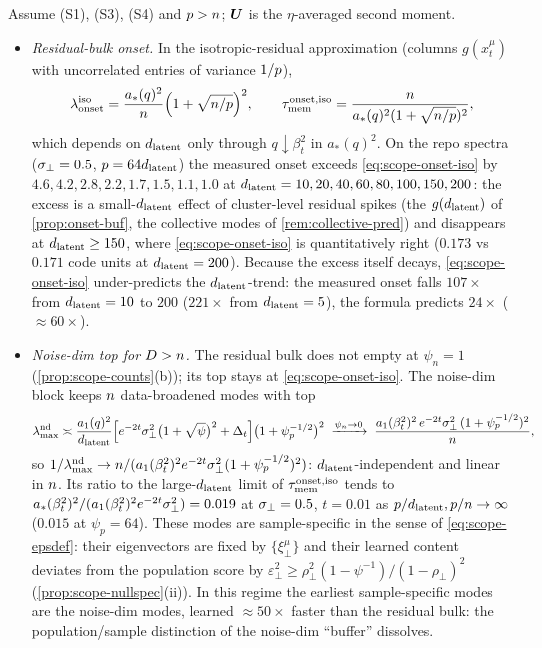 \begin{proposition}\label{prop:scope-rebound}
Assume (S1), (S3), (S4) and $p>n$; $\bm{U}$ is the $\eta$-averaged second moment.
\begin{itemize}
\item[(a)] \emph{Residual-bulk onset.} In the isotropic-residual approximation (columns $g(x^\mu_t)$ with uncorrelated entries of variance $1/p$),
\begin{equation}\label{eq:scope-onset-iso}
\lambda_{\rm onset}^{\rm iso}=\frac{a_*(q)^2}{n}\Big(1+\sqrt{n/p}\Big)^2,\qquad \tau_{\mathrm{mem}}^{\rm onset,iso}=\frac{n}{a_*(q)^2(1+\sqrt{n/p})^2},
\end{equation}
which depends on $d_{\mathrm{latent}}$ only through $q\downarrow\beta_t^2$ in $a_*(q)^2$. On the repo spectra ($\sigma_{\perp}=0.5$, $p=64d_{\mathrm{latent}}$) the measured onset exceeds \eqref{eq:scope-onset-iso} by $4.6,4.2,2.8,2.2,1.7,1.5,1.1,1.0$ at $d_{\mathrm{latent}}=10,20,40,60,80,100,150,200$: the excess is a small-$d_{\mathrm{latent}}$ effect of cluster-level residual spikes (the $g(d_{\mathrm{latent}})$ of \cref{prop:onset-buf}, the collective modes of \cref{rem:collective-pred}) and disappears at $d_{\mathrm{latent}}\ge150$, where \eqref{eq:scope-onset-iso} is quantitatively right ($0.173$ vs $0.171$ code units at $d_{\mathrm{latent}}=200$). Because the excess itself decays, \eqref{eq:scope-onset-iso} under-predicts the $d_{\mathrm{latent}}$-trend: the measured onset falls $107\times$ from $d_{\mathrm{latent}}=10$ to $200$ ($221\times$ from $d_{\mathrm{latent}}=5$), the formula predicts $24\times$ ($\approx60\times$).
\item[(b)] \emph{Noise-dim top for $D>n$.} The residual bulk does not empty at $\psi_n=1$ (\cref{prop:scope-counts}(b)); its top stays at \eqref{eq:scope-onset-iso}. The noise-dim block keeps $n$ data-broadened modes with top
\begin{equation}\label{eq:scope-onset-rd}
\lambda^{\rm nd}_{\max}\asymp\frac{a_1(q)^2}{d_{\mathrm{latent}}}\Big[e^{-2t}\sigma_{\perp}^2\big(1+\sqrt{\psi}\big)^2+\Delta_t\Big]\big(1+\psi_p^{-1/2}\big)^2\;\xrightarrow{\psi_n\to0}\;\frac{a_1(\beta_t^2)^2\,e^{-2t}\sigma_{\perp}^2\,(1+\psi_p^{-1/2})^2}{n},
\end{equation}
so $1/\lambda^{\rm nd}_{\max}\to n/(a_1(\beta_t^2)^2e^{-2t}\sigma_{\perp}^2(1+\psi_p^{-1/2})^2)$: $d_{\mathrm{latent}}$-independent and linear in $n$. Its ratio to the large-$d_{\mathrm{latent}}$ limit of $\tau_{\mathrm{mem}}^{\rm onset,iso}$ tends to $a_*(\beta_t^2)^2/(a_1(\beta_t^2)^2e^{-2t}\sigma_{\perp}^2)=0.019$ at $\sigma_{\perp}=0.5$, $t=0.01$ as $p/d_{\mathrm{latent}},p/n\to\infty$ ($0.015$ at $\psi_p=64$). These modes are sample-specific in the sense of \eqref{eq:scope-epsdef}: their eigenvectors are fixed by $\{\xi^\mu_\perp\}$ and their learned content deviates from the population score by $\varepsilon_\perp^2\ge\rho_\perp^2(1-\psi^{-1})/(1-\rho_\perp)^2$ (\cref{prop:scope-nullspec}(ii)). In this regime the earliest sample-specific modes are the noise-dim modes, learned $\approx50\times$ faster than the residual bulk: the population/sample distinction of the noise-dim ``buffer'' dissolves.
\end{itemize}
\end{proposition}
